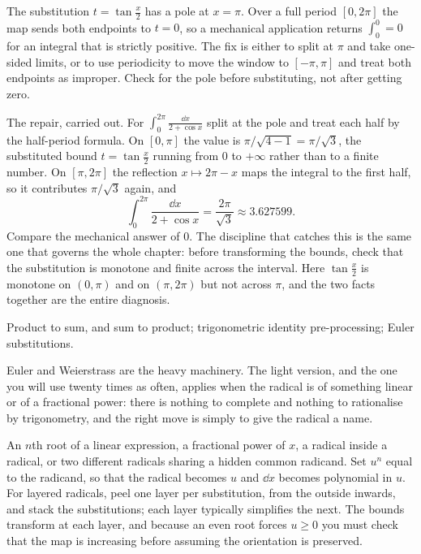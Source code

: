 \begin{trap}
The substitution $t=\tan\tfrac x2$ has a pole at $x=\pi$. Over a full period $[0,2\pi]$ the map sends both endpoints to $t=0$, so a mechanical application returns $\int_0^0=0$ for an integral that is strictly positive. The fix is either to split at $\pi$ and take one-sided limits, or to use periodicity to move the window to $[-\pi,\pi]$ and treat both endpoints as improper. Check for the pole before substituting, not after getting zero.
\end{trap}

The repair, carried out. For $\displaystyle\int_0^{2\pi}\frac{\dd x}{2+\cos x}$ split at the pole and treat each half by the half-period formula. On $[0,\pi]$ the value is $\pi/\sqrt{4-1}=\pi/\sqrt3$, the substituted bound $t=\tan\tfrac x2$ running from $0$ to $+\infty$ rather than to a finite number. On $[\pi,2\pi]$ the reflection $x\mapsto2\pi-x$ maps the integral to the first half, so it contributes $\pi/\sqrt3$ again, and
\[
\int_0^{2\pi}\frac{\dd x}{2+\cos x}=\frac{2\pi}{\sqrt3}\approx3.627599 .
\]
Compare the mechanical answer of $0$. The discipline that catches this is the same one that governs the whole chapter: before transforming the bounds, check that the substitution is monotone and finite across the interval. Here $\tan\tfrac x2$ is monotone on $(0,\pi)$ and on $(\pi,2\pi)$ but not across $\pi$, and the two facts together are the entire diagnosis.

\begin{seealsob}Product to sum, and sum to product; trigonometric identity pre-processing; Euler substitutions.\end{seealsob}

Euler and Weierstrass are the heavy machinery. The light version, and the one you will use twenty times as often, applies when the radical is of something linear or of a fractional power: there is nothing to complete and nothing to rationalise by trigonometry, and the right move is simply to give the radical a name.

\cue An $n$th root of a linear expression, a fractional power of $x$, a radical inside a radical, or two different radicals sharing a hidden common radicand.
\method Set $u^n$ equal to the radicand, so that the radical becomes $u$ and $\dd x$ becomes polynomial in $u$. For layered radicals, peel one layer per substitution, from the outside inwards, and stack the substitutions; each layer typically simplifies the next. The bounds transform at each layer, and because an even root forces $u\geq0$ you must check that the map is increasing before assuming the orientation is preserved.

